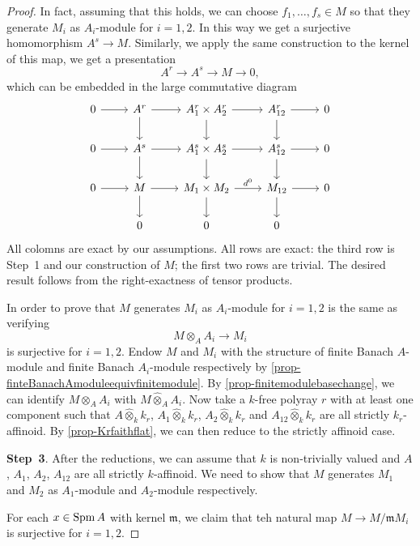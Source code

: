 \begin{proof}
    In fact, assuming that this holds, we can choose $f_1,\ldots,f_s\in M$ so that they generate $M_i$ as $A_i$-module for $i=1,2$. In this way we get a surjective homomorphism $A^s\rightarrow M$. Similarly, we apply the same construction to the kernel of this map, we get a presentation 
    \[
        A^r\rightarrow A^s\rightarrow M\rightarrow 0,
    \]
    which can be embedded in the large commutative diagram
    \[
        \begin{tikzcd}
            0 \arrow[r] & A^r \arrow[r] \arrow[d] & A_1^r\times A_2^r \arrow[r] \arrow[d] & A_{12}^r \arrow[r] \arrow[d] & 0 \\
            0 \arrow[r] & A^s \arrow[r] \arrow[d] & A_1^s\times A_2^s \arrow[r] \arrow[d] & A_{12}^s \arrow[r] \arrow[d] & 0 \\
            0 \arrow[r] & M \arrow[r] \arrow[d]   & M_1\times M_2 \arrow[r,"d^0"] \arrow[d]     & M_{12} \arrow[r] \arrow[d]   & 0 \\
                        & 0                       & 0                                     & 0                            &  
        \end{tikzcd}  
    \]
    All colomns are exact by our assumptions. All rows are exact: the third row is Step~1 and our construction of $M$; the first two rows are trivial. The desired result follows from the right-exactness of tensor products.

    In order to prove that $M$ generates $M_i$ as $A_i$-module for $i=1,2$ is the same as verifying 
    \[
        M\otimes_A A_i\rightarrow M_i   
    \]
    is surjective for $i=1,2$. Endow $M$ and $M_i$ with the structure of finite Banach $A$-module and finite Banach $A_i$-module respectively by \cref{prop-finteBanachAmoduleequivfinitemodule}. By \cref{prop-finitemodulebasechange}, we can identify $M\otimes_A A_i$ with $M\hat{\otimes}_A A_i$. Now take a $k$-free polyray $r$ with at least one component  such that $A\hat{\otimes}_k k_r$, $A_1\hat{\otimes}_k k_r$, $A_2\hat{\otimes}_k k_r$ and $A_{12}\hat{\otimes}_k k_r$ are all strictly $k_r$-affinoid. By \cref{prop-Krfaithflat}, we can then reduce to the strictly affinoid case.

    \textbf{Step~3}. After the reductions, we can assume that $k$ is non-trivially valued and $A$, $A_1$, $A_2$, $A_{12}$ are all strictly $k$-affinoid. We need to show that $M$ generates $M_1$ and $M_2$ as $A_1$-module and $A_2$-module respectively.


    For each $x\in \operatorname{Spm} A$ with kernel $\mathfrak{m}$, we claim that teh natural map $M\rightarrow M/\mathfrak{m}M_i$ is surjective for $i=1,2$.


\end{proof}
